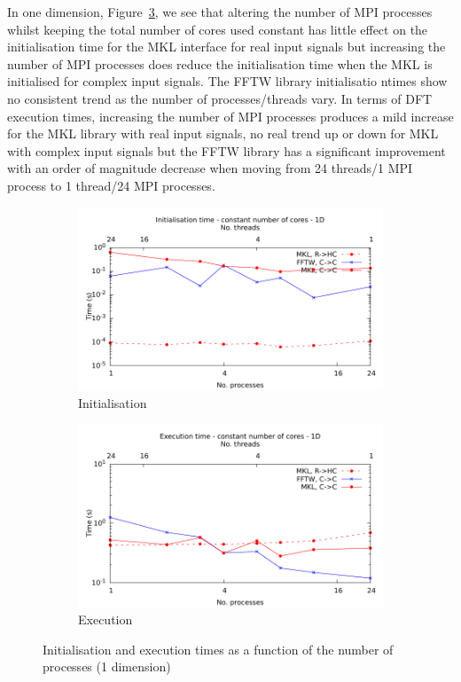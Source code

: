\documentclass[12pt, a4paper]{article} \setlength{\textheight}{24cm}
\begin{document}
In one dimension, Figure~\ref{1DCONST}, we see that altering the
number of MPI processes whilst keeping the total number of cores used
constant has little effect on the initialisation time for the MKL
interface for real input signals but increasing the number of MPI
processes does reduce the initialisation time when the MKL is
initialised for complex input signals. The FFTW library initialisatio
ntimes show no consistent trend as the number of processes/threads
vary. In terms of DFT execution times, increasing the number of MPI
processes produces a mild increase for the MKL library with real input
signals, no real trend up or down for MKL with complex input signals
but the FFTW library has a significant improvement with an order of
magnitude decrease when moving from 24 threads/1 MPI process to 1
thread/24 MPI processes.




\begin{figure}[H]
  \centering
  \begin{subfigure}{.5\textwidth}
    \centering
    \includegraphics[width=.9\linewidth]{graphs/const-init-1d.pdf}
    \caption{Initialisation}
    \label{1DCONSTI}
  \end{subfigure}%
  \begin{subfigure}{.5\textwidth}
    \centering
    \includegraphics[width=.9\linewidth]{graphs/const-exec-1d.pdf}
    \caption{Execution}
    \label{1DCONSTE}
  \end{subfigure}
  \caption{Initialisation and execution times as a function of the
    number of processes (1 dimension)}
  \label{1DCONST}
\end{figure}
\end{document}
